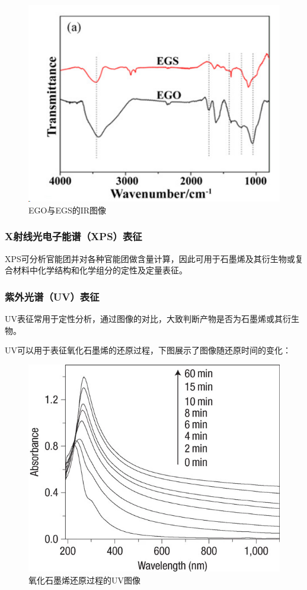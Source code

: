 \begin{figure}
    \centering
    \includegraphics{img/IR}
    \caption{EGO与EGS的IR图像}
\end{figure}


\subsubsection{X射线光电子能谱（XPS）表征}

XPS可分析官能团并对各种官能团做含量计算，因此可用于石墨烯及其衍生物或复合材料中化学结构和化学组分的定性及定量表征。



\subsubsection{紫外光谱（UV）表征}

UV表征常用于定性分析，通过图像的对比，大致判断产物是否为石墨烯或其衍生物。

UV可以用于表征氧化石墨烯的还原过程，下图展示了图像随还原时间的变化\cite{Li2008}：

\begin{figure}
    \centering
    \includegraphics[scale=0.8]{img/UV}
    \caption{氧化石墨烯还原过程的UV图像}
\end{figure}

